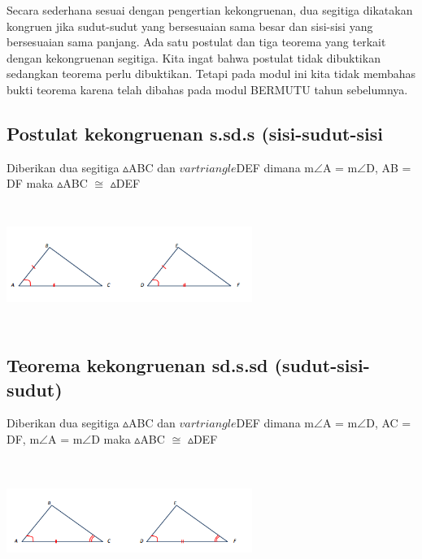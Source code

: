 \documentclass[11pt,fleqn]{book} %
\begin{document}
Secara sederhana sesuai dengan pengertian kekongruenan, dua segitiga dikatakan
kongruen jika sudut-sudut yang bersesuaian sama besar dan sisi-sisi yang bersesuaian
sama panjang. Ada satu postulat dan tiga teorema yang terkait dengan kekongruenan
segitiga. Kita ingat bahwa postulat tidak dibuktikan sedangkan teorema perlu
dibuktikan. Tetapi pada modul ini kita tidak membahas bukti teorema karena telah
dibahas pada modul BERMUTU tahun sebelumnya. 

\subsection{Postulat kekongruenan s.sd.s (sisi-sudut-sisi}


\begin{theorem}

Diberikan dua segitiga $\vartriangle $ABC dan $vartriangle $DEF dimana m$\angle$A = m$\angle$D, AB = DF maka $\vartriangle $ABC $\cong$ $\vartriangle $DEF
\end{theorem}
\includegraphics[width = 8cm, height= 4cm]{Pictures/4.png}
\subsection{Teorema kekongruenan sd.s.sd (sudut-sisi-sudut)}
\begin{theorem}
Diberikan dua segitiga $\vartriangle $ABC dan $vartriangle $DEF dimana m$\angle$A = m$\angle$D, AC = DF, m$\angle$A = m$\angle$D maka $\vartriangle $ABC $\cong$ $\vartriangle $DEF
\end{theorem}
\includegraphics[width = 8cm, height= 4cm]{Pictures/5.png}
\end{document}
